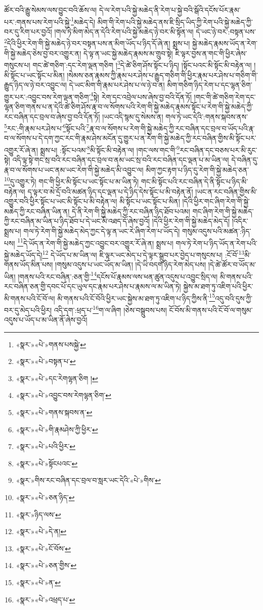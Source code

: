 ཚོར་བའི་རྒྱུ་སེམས་ལས་བྱུང་བའི་ཆོས་ལ། དེ་ལ་རེག་པའི་སྐྱེ་མཆེད་ནི་རེག་པ་སྐྱེ་བའི་སྒོའི་དངོས་པོར་རྣམ་པར་:གནས་པས་རེག་པའི་སྐྱེ་\footnote{«སྣར་»«པེ་»གནས་པསསྐྱེ་}མཆེད་དེ། མིག་གི་རེག་པའི་སྐྱེ་མཆེད་ནས་ཇི་སྲིད་ཡིད་ཀྱི་རེག་པའི་སྐྱེ་མཆེད་ཀྱི་བར་དུ་རིག་པར་བྱའོ། །གལ་ཏེ་མིག་མེད་ན་དེའི་རེག་པའི་སྐྱེ་མཆེད་ཉེ་བར་མི་སྟོན་ལ། དེ་ཡང་ཉེ་བར་:བསྟན་པས་\footnote{«སྣར་»«པེ་»བསྟན་པ་}དེའི་ཕྱིར་རེག་གི་སྐྱེ་མཆེད་ཉེ་བར་བསྟན་པས་ན་མིག་ཡོད་པ་ཉིད་དོ་ཞེ་ན། སྨྲས་པ། སྐྱེ་མཆེད་རྣམས་ཡོད་ན་རེག་གི་སྐྱེ་མཆེད་ཅེས་བྱ་བར་འགྱུར་ན། དེ་ལྟ་ན་ཡང་སྐྱེ་མཆེད་རྣམས་མ་གྲུབ་སྟེ། ཇི་ལྟར་བྱས་ན་གང་གི་ཕྱིར་ཞེས་གསུངས་པ། གང་ཚེ་གཅིག་:དང་རེག་ལྡན་གཅིག །\footnote{«སྣར་»«པེ་»དང་རེགལྷན་ཅིག །}དེ་ཚེ་ཅིག་ཤོས་སྟོང་པ་ཉིད། །སྟོང་པའང་མི་སྟོང་མི་བརྟེན་ལ། །མི་སྟོང་པ་ཡང་སྟོང་པ་མིན། །སེམས་ཅན་རྣམས་ཀྱི་རྣམ་པར་ཤེས་པ་རྒྱུད་གཅིག་གི་ཕྱིར་རྣམ་པར་ཤེས་པ་གཅིག་གི་རྒྱུད་ཉིད་ལ་ཉེ་བར་འབྱུང་ལ། དེ་ཡང་མིག་གི་རྣམ་པར་ཤེས་པ་ལ་ཉེ་བ་ན། མིག་གཅིག་ཉིད་རེག་པ་དང་ལྷན་ཅིག་གྱུར་པར་:འབྱུང་བས་རེག་ལྡན་གཅིག་\footnote{«སྣར་»«པེ་»འབྱུང་བས་རེགལྷན་ཅིག་}སྟེ། རེག་དང་འབྲེལ་པས་ཞེས་བྱ་བའི་དོན་ཏོ། །གང་གི་ཚེ་གཅིག་རེག་དང་ལྷན་ཅིག་གནས་པ་ན་དེའི་ཚེ་ཅིག་ཤོས་རྣ་བ་ལ་སོགས་པའི་རེག་གི་སྐྱེ་མཆེད་རྣམས་སྟོང་པ་རེག་གི་སྐྱེ་མཆེད་ཀྱི་རང་བཞིན་དང་བྲལ་བ་ཞེས་བྱ་བའི་དོན་ཏོ། །ཡང་འདི་སྙམ་དུ་སེམས་ན། གལ་ཏེ་ཡང་དེའི་:གནས་སྐབས་ནས་\footnote{«སྣར་»«པེ་»གནས་སྐབས་ན་}རང་:གི་རྣམ་པར་ཤེས་པ་\footnote{«སྣར་»«པེ་»གི་རྣམཤེས་ཀྱི་ཕྱིར་}སྟོང་པའི་\footnote{«སྣར་»«པེ་»པའི་ཕྱིར་}རྣ་བ་ལ་སོགས་པ་རེག་གི་སྐྱེ་མཆེད་ཀྱི་རང་བཞིན་དང་བྲལ་བ་ཡོད་པའི་རྣ་བ་ལ་སོགས་པ་དེ་དག་ཀྱང་རང་གི་རྣམ་ཤེས་མངོན་དུ་གྱུར་པ་ན་རེག་གི་སྐྱེ་མཆེད་ཀྱི་རང་བཞིན་གྱིས་མི་སྟོང་པར་འགྱུར་རོ་ཞེ་ན། སྨྲས་པ། :སྟོང་པའམ་\footnote{«སྣར་»«པེ་»སྟོངཔའང་}མི་སྟོང་མི་བརྟེན་ལ། །གང་ལས་གང་གི་\footnote{«སྣར་»གིས་རང་བཞིན་དང་བྲལ་བ་སླར་ཡང་དེའི་«པེ་»གིས་}རང་བཞིན་དང་བཅས་པར་མི་རུང་སྟེ། འདི་ལྟ་སྟེ་གང་སྲ་བའི་རང་བཞིན་དང་བྲལ་བ་ནམ་ཡང་སྲ་བའི་རང་བཞིན་དང་ལྡན་པ་མ་ཡིན་ལ། དེ་བཞིན་དུ་རྣ་བ་ལ་སོགས་པ་ཡང་ནམ་ཡང་རེག་གི་སྐྱེ་མཆེད་མི་འབྱུང་ལ། མིག་ཀྱང་རྟག་པ་ཉིད་དུ་རེག་གི་སྐྱེ་མཆེད་ཅན་\footnote{«སྣར་»«པེ་»ཅན་ཉིད་}དུ་འགྱུར་ཏེ། གང་གི་ཕྱིར་མི་སྟོང་པ་ཡང་སྟོང་པ་མ་ཡིན་ཏེ། གང་མི་སྟོང་པའི་རང་བཞིན་དེ་ནི་སྟོང་པ་ཉིད་མི་བརྟེན་ལ། ད་ལྟར་བ་མེ་དྲོ་བའི་མཚན་ཉིད་དང་ལྡན་པ་དེ་ཉིད་དེས་སྟོང་པ་མི་བརྟེན་ནོ། །ཡང་ན་རང་བཞིན་གྱིས་མི་འགྱུར་བའི་ཕྱིར་སྟོང་པ་ཡང་མི་སྟོང་པ་མི་བརྟེན་ལ། མི་སྟོང་པ་ཡང་སྟོང་པ་མིན། །དེའི་ཕྱིར་གང་ཞིག་རེག་གི་སྐྱེ་མཆེད་ཀྱི་རང་བཞིན་ཡིན་ན། དེ་ནི་རེག་གི་སྐྱེ་མཆེད་ཀྱི་རང་བཞིན་ཉིད་ཐོབ་པའམ། གང་ཞིག་རེག་གི་སྐྱེ་མཆེད་ཀྱི་རང་བཞིན་མ་ཡིན་པ་ཉིད་ཐོབ་པ་དེ་ཡང་མི་འཐད་དོ་ཞེས་བྱའོ། །དེའི་ཕྱིར་རེག་གི་སྐྱེ་མཆེད་མེད་དོ། །འདིར་སྨྲས་པ། གལ་ཏེ་རེག་གི་སྐྱེ་མཆེད་མེད་ཀྱང་དེ་ལྟ་ན་ཡང་རེ་ཞིག་རེག་པ་ཡོད་དེ། གསུམ་འདུས་པའི་མཚན་:ཉིད་པས། \footnote{«སྣར་»ཉིད་ལས་}དེ་ཡོད་ན་རེག་གི་སྐྱེ་མཆེད་ཀྱང་འབྱུང་བར་འགྱུར་རོ་ཞེ་ན། སྨྲས་པ། གལ་ཏེ་རེག་པ་ཉིད་ཡོད་ན་རེག་པའི་སྐྱེ་མཆེད་ཡོད་དེ།\footnote{«སྣར་»«པེ་»དེ་ན།} དེ་ཡོད་པ་མ་ཡིན་ལ། ཇི་ལྟར་ཡང་མེད་པ་དེ་ལྟར་སྒྲུབ་པར་བྱེད་པ་གསུངས་པ། :ངོ་བོ་\footnote{«སྣར་»«པེ་»ངོ་བོས་}མི་གནས་ཡོད་མིན་པས། །གསུམ་འདུས་པ་ཡང་ཡོད་མ་ཡིན། །དེ་ཡི་བདག་ཉིད་རེག་མེད་པས། །དེ་ཚེ་ཚོར་བ་ཡོད་མ་ཡིན། །གནས་པའི་རང་བཞིན་:ཅན་གྱི་\footnote{«སྣར་»«པེ་»ཅན་གྱིས་}དངོས་པོ་རྣམས་ལས་ཕན་ཚུན་འདུས་པ་འབྱུང་སྲིད་ལ། མི་གནས་པའི་རང་བཞིན་ཅན་གྱི་དབང་པོ་དང་ཡུལ་དང་རྣམ་པར་ཤེས་པ་རྣམས་ལ་མ་ཡིན་ཏེ། སྐྱེས་མ་ཐག་ཏུ་འཇིག་པའི་ཕྱིར་མི་གནས་པའི་ངོ་བོ་ལ། མི་གནས་པའི་ངོ་བོའི་ཕྱིར་ཡང་སྐྱེས་མ་ཐག་ཏུ་འཇིག་པ་ཉིད་ཀྱིས་ནི་\footnote{«སྣར་»«པེ་»ན་}འདུ་བའི་དུས་ཀྱི་བར་དུ་མེད་པའི་ཕྱིར། འདི་དག་:ཕྲད་པ་\footnote{«སྣར་»«པེ་»འཕྲད་པ་}ག་ལ་ཞིག །ཅེས་བསྒྲུབས་པས། ངོ་བོས་མི་གནས་པའི་ངོ་བོ་ལ་གསུམ་འདུས་པ་ཡོད་པ་མ་ཡིན་ནོ་ཞེས་བྱའོ། 